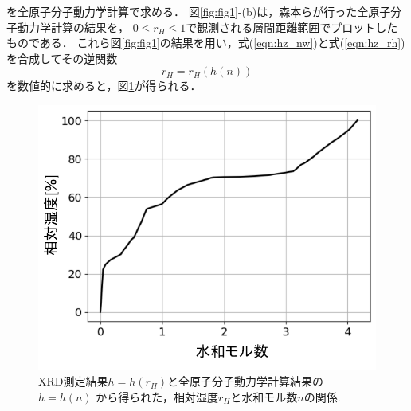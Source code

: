 を全原子分子動力学計算で求める．
図\ref{fig:fig1}-(b)は，森本ら\cite{Morimoto}が行った全原子分子動力学計算の結果を，
$0\leq r_H \leq 1$で観測される層間距離範囲でプロットしたものである．
これら図\ref{fig:fig1}の結果を用い，式(\ref{eqn:hz_nw})と式(\ref{eqn:hz_rh})
を合成してその逆関数
\begin{equation}
	r_H=r_H(h(n))
	\label{eqn:rh_nw}
\end{equation}
を数値的に求めると，図\ref{fig:fig6}が得られる．
\begin{figure}[h]
	\begin{center}
	\includegraphics[width=0.6\linewidth]{Figs/fig6.pdf} 
	\end{center}
	\caption{
		XRD測定結果\(h=h(r_H)\)と全原子分子動力学計算結果の\(h=h(n)\)
		から得られた，相対湿度$r_H$と水和モル数$n$の関係.
	} 
	\label{fig:fig6}
\end{figure}
